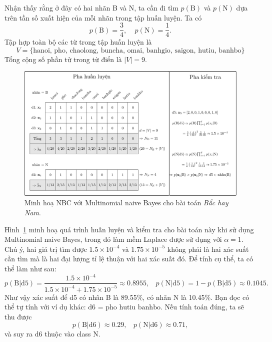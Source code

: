 Nhận thấy rằng ở đây có hai nhãn B và N, ta cần đi tìm $p(\text{B})$ và $p(\text{N})$ dựa trên tần số xuất hiện của mỗi nhãn trong tập huấn luyện. Ta có
\begin{equation}
\label{eqn:32_8}
p(\text{B}) = \frac{3}{4}, ~~~~~ p(\text{N}) = \frac{1}{4}.
\end{equation}
Tập hợp toàn bộ các từ trong tập huấn luyện là
$$V = \{\text{hanoi, pho, chaolong, buncha, omai, banhgio, saigon, hutiu, banhbo}\}$$
Tổng cộng số phần tử trong từ điển là $|V| = 9$.

\begin{figure}[t]
\centering
\includegraphics[width = \textwidth]{Chapters/03_SimpleML/32_nbc/latex/nbc.pdf}
\caption[]{Minh hoạ NBC với Multinomial naive Bayes cho bài toán \textit{Bắc hay Nam}.}
\label{fig:32_bn}
\end{figure}

Hình~\ref{fig:32_bn} minh hoạ quá trình huấn luyện và kiểm tra cho bài toán này
khi sử dụng Multinomial naive Bayes, trong đó làm mềm Laplace được sử dụng với
$\alpha = 1$. Chú ý, hai giá trị tìm được $1.5\times 10^{-4}$ và $1.75\times 10^{-5}$ không phải là hai xác suất cần tìm mà là hai đại lượng {tỉ lệ thuận} với hai xác suất đó. Để tính cụ thể, ta có thể làm như sau:
\begin{equation*}
p(\text{B} | \text{d5}) = \frac{1.5\times 10^{-4}}{1.5\times 10^{-4} + 1.75\times 10^{-5}} \approx 0.8955, ~~~~ p(\text{N} | \text{d5}) = 1 - p(\text{B} | \text{d5}) \approx 0.1045.
\end{equation*}
Như vậy xác suất để d5 có nhãn B là 89.55\%, có nhãn N là 10.45\%.
Bạn đọc có thể tự tính với ví dụ khác: $\text{d6 = pho hutiu banhbo}$. Nếu tính toán đúng, ta sẽ thu được
\begin{equation*}
p(\text{B} | \text{d6}) \approx 0.29, ~~~~ p(\text{N} | \text{d6}) \approx 0.71,
\end{equation*}
và suy ra $\text{d6}$ thuộc vào class N.

